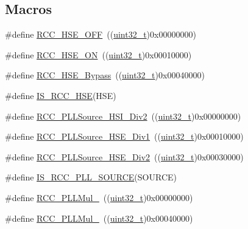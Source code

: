 \subsection*{Macros}
\begin{DoxyCompactItemize}
\item 
\#define \hyperlink{group___h_s_e__configuration_ga1616626d23fbce440398578855df6f97}{R\+C\+C\+\_\+\+H\+S\+E\+\_\+\+O\+FF}~((\hyperlink{_p_e___types_8h_a33594304e786b158f3fb30289278f5af}{uint32\+\_\+t})0x00000000)
\item 
\#define \hyperlink{group___h_s_e__configuration_gabc4f70a44776c557af20496b04d9a9db}{R\+C\+C\+\_\+\+H\+S\+E\+\_\+\+ON}~((\hyperlink{_p_e___types_8h_a33594304e786b158f3fb30289278f5af}{uint32\+\_\+t})0x00010000)
\item 
\#define \hyperlink{group___h_s_e__configuration_ga09061e9909d5f588baa7bfb0f7edd9fa}{R\+C\+C\+\_\+\+H\+S\+E\+\_\+\+Bypass}~((\hyperlink{_p_e___types_8h_a33594304e786b158f3fb30289278f5af}{uint32\+\_\+t})0x00040000)
\item 
\#define \hyperlink{group___h_s_e__configuration_ga287bbcafd73d07ec915c2f793301908a}{I\+S\+\_\+\+R\+C\+C\+\_\+\+H\+SE}(H\+SE)
\item 
\#define \hyperlink{group___p_l_l__entry__clock__source_ga53194dd3e2986980b156a3e8e456df06}{R\+C\+C\+\_\+\+P\+L\+L\+Source\+\_\+\+H\+S\+I\+\_\+\+Div2}~((\hyperlink{_p_e___types_8h_a33594304e786b158f3fb30289278f5af}{uint32\+\_\+t})0x00000000)
\item 
\#define \hyperlink{group___p_l_l__entry__clock__source_ga62f02bf60a89bdef0d3a8137da3f4c2d}{R\+C\+C\+\_\+\+P\+L\+L\+Source\+\_\+\+H\+S\+E\+\_\+\+Div1}~((\hyperlink{_p_e___types_8h_a33594304e786b158f3fb30289278f5af}{uint32\+\_\+t})0x00010000)
\item 
\#define \hyperlink{group___p_l_l__entry__clock__source_ga24863bc670737a2f5abce546a49e620c}{R\+C\+C\+\_\+\+P\+L\+L\+Source\+\_\+\+H\+S\+E\+\_\+\+Div2}~((\hyperlink{_p_e___types_8h_a33594304e786b158f3fb30289278f5af}{uint32\+\_\+t})0x00030000)
\item 
\#define \hyperlink{group___p_l_l__entry__clock__source_ga8a8a84a16989bb4e5aca1af65ccf9a1b}{I\+S\+\_\+\+R\+C\+C\+\_\+\+P\+L\+L\+\_\+\+S\+O\+U\+R\+CE}(S\+O\+U\+R\+CE)
\item 
\#define \hyperlink{group___p_l_l__multiplication__factor_ga91b3b28fa4d56693d1eb361e24f317af}{R\+C\+C\+\_\+\+P\+L\+L\+Mul\+\_}~((\hyperlink{_p_e___types_8h_a33594304e786b158f3fb30289278f5af}{uint32\+\_\+t})0x00000000)
\item 
\#define \hyperlink{group___p_l_l__multiplication__factor_gafc2dd6c503b9ee6e0cfbec6d7d3a3e00}{R\+C\+C\+\_\+\+P\+L\+L\+Mul\+\_}~((\hyperlink{_p_e___types_8h_a33594304e786b158f3fb30289278f5af}{uint32\+\_\+t})0x00040000)

\end{DoxyCompactItemize}
